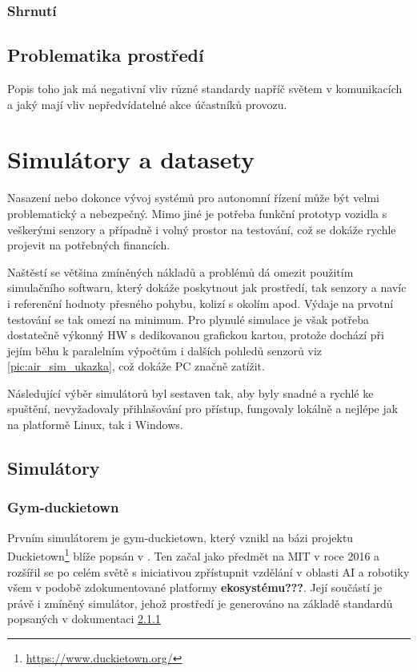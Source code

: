 \documentclass[czech, bc, kky, he, iso690alph]{fasthesis}
\begin{document}
            \subsection{Shrnutí}
            	
            
    	\section{Problematika prostředí}
    		Popis toho jak má negativní vliv různé standardy napříč světem v komunikacích a jaký mají vliv nepředvídatelné akce účastníků provozu.
    \chapter{Simulátory a datasety}
    	Nasazení nebo dokonce vývoj systémů pro autonomní řízení může být velmi problematický a nebezpečný. Mimo jiné je potřeba funkční prototyp vozidla s veškerými senzory a případně i volný prostor na testování, což se dokáže rychle projevit na potřebných financích.
    	
    	Naštěstí se většina zmíněných nákladů a problémů dá omezit použitím simulačního softwaru, který dokáže poskytnout jak prostředí, tak senzory a navíc i referenční hodnoty přesného pohybu, kolizí s okolím apod. Výdaje na prvotní testování se tak omezí na minimum. Pro plynulé simulace je však potřeba dostatečně výkonný HW s dedikovanou grafickou kartou, protože dochází při jejím běhu k paralelním výpočtům i dalších pohledů senzorů viz \ref{pic:air_sim_ukazka}, což dokáže PC značně zatížit.
    	
    	Následující výběr simulátorů byl sestaven tak, aby byly snadné a rychlé ke spuštění, nevyžadovaly přihlašování pro přístup, fungovaly lokálně a nejlépe jak na platformě Linux, tak i Windows.
    	\section{Simulátory}
    		\subsection{Gym-duckietown}
    			Prvním simulátorem je gym-duckietown, který vznikl na bázi projektu Duckietown\footnote{\href{https://www.duckietown.org/}{https://www.duckietown.org/}} blíže popsán v \cite{Duckietown}. Ten začal jako předmět na MIT v roce 2016 a rozšířil se po celém světě s iniciativou zpřístupnit vzdělání v oblasti AI a robotiky všem v podobě zdokumentované platformy \textbf{ekosystému???}. Její součástí je právě i zmíněný simulátor, jehož prostředí je generováno na základě standardů popsaných v dokumentaci \ref{}
    			
\end{document}
